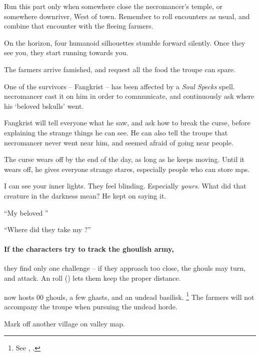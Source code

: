 Run this part only when somewhere close the \gls{necromancer}'s temple, or somewhere downriver, West of \gls{town}.
Remember to roll encounters as usual, and combine that encounter with the fleeing farmers.

\begin{boxtext}
  On the horizon, four humanoid silhouettes stumble forward silently.
  Once they see you, they start running towards you.
\end{boxtext}

The farmers arrive famished, and request all the food the troupe can spare.

One of the survivors -- Fangkrist -- has been affected by a \textit{Soul Specks} spell.
\Gls{necromancer} cast it on him in order to communicate, and continuously ask where his `beloved \gls{bskulls}' went.

Fangkrist will tell everyone what he saw, and ask how to break the curse, before explaining the strange things he can see.
He can also tell the troupe that \gls{necromancer} never went near him, and seemed afraid of going near people.

The curse wears off by the end of the day, as long as he keeps moving.
Until it wears off, he gives everyone strange stares, especially people who can store \glspl{mp}.

\begin{speechtext}
  I can see your inner lights.
  They feel blinding.
  Especially \emph{yours}.%
  What did that creature in the darkness mean?
  He kept on saying it.

  ``My beloved ''

  ``Where did they take my ?''
\end{speechtext}

\paragraph{If the characters try to track the ghoulish army,}
they find only one challenge -- if they approach too close, the ghouls may turn, and attack.
An  roll (\tn[10]) lets them keep the proper distance.

 now hosts 00 ghouls, a few ghasts, and an undead basilisk.%
\footnote{See , .}
The farmers will not accompany the troupe when pursuing the undead horde.

Mark off another \gls{village} on \gls{valley} map.

